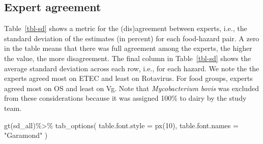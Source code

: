 \documentclass[
  letterpaper,
  DIV=11,
  numbers=noendperiod]{scrartcl}
\newenvironment{Shaded}{\begin{snugshade}}{\end{snugshade}}
\newcommand{\AttributeTok}[1]{\textcolor[rgb]{0.40,0.45,0.13}{#1}}
\newcommand{\DecValTok}[1]{\textcolor[rgb]{0.68,0.00,0.00}{#1}}
\newcommand{\FunctionTok}[1]{\textcolor[rgb]{0.28,0.35,0.67}{#1}}
\newcommand{\NormalTok}[1]{\textcolor[rgb]{0.00,0.23,0.31}{#1}}
\newcommand{\SpecialCharTok}[1]{\textcolor[rgb]{0.37,0.37,0.37}{#1}}
\newcommand{\StringTok}[1]{\textcolor[rgb]{0.13,0.47,0.30}{#1}}
\begin{document}
\subsection{Expert agreement}\label{expert-agreement}

Table~\ref{tbl-sd} shows a metric for the (dis)agreement between
experts, i.e., the standard deviation of the estimates (in percent) for
each food-hazard pair. A zero in the table means that there was full
agreement among the experts, the higher the value, the more
disagreement. The final column in Table~\ref{tbl-sd} shows the average
standard deviation across each row, i.e., for each hazard. We note the
the experts agreed most on ETEC and least on Rotavirus. For food groups,
experts agreed most on OS and least on Vg. Note that \emph{Mycobacterium
bovis} was excluded from these considerations because it was assigned
100\% to dairy by the study team.

\begin{Shaded}
\begin{Highlighting}[]
\FunctionTok{gt}\NormalTok{(sd\_all)}\SpecialCharTok{\%\textgreater{}\%} 
  \FunctionTok{tab\_options}\NormalTok{(}
    \AttributeTok{table.font.style =} \FunctionTok{px}\NormalTok{(}\DecValTok{10}\NormalTok{),}
    \AttributeTok{table.font.names =} \StringTok{"Garamond"}
\NormalTok{  )}
\end{Highlighting}
\end{Shaded}
\end{document}
